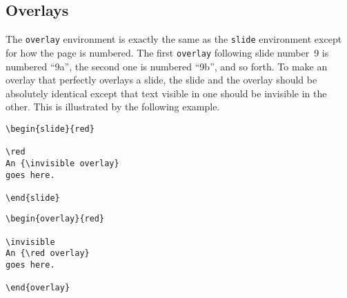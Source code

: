 

\subsection{Overlays}

The \xsp{}\mbox{\tt overlay}\xsp{}
environment is exactly the same as the \xsp{}\mbox{\tt slide}\xsp{}
environment except for how the page is numbered.  The first
\xsp{}\mbox{\tt overlay}\xsp{} following slide number~9 is numbered
``9a'', the second one is numbered ``9b'', and so forth.  To make an
overlay that perfectly overlays a slide, the slide and the overlay
should be absolutely identical except that text visible in one should
be invisible in the other.  This is illustrated by the following
example.

\settowidth{\dimen2}{\xipt\sf overlay}
\settowidth{\dimen0}{\xipt \sf An}
\begin{exambox}
\midbox
\begin{verbatim}
\begin{slide}{red}

\red
An {\invisible overlay}
goes here.

\end{slide}
\end{verbatim}
\end{exambox}
\begin{exambox}
\midbox
\begin{verbatim}
\begin{overlay}{red}

\invisible
An {\red overlay}
goes here.

\end{overlay}
\end{verbatim}
\end{exambox}

